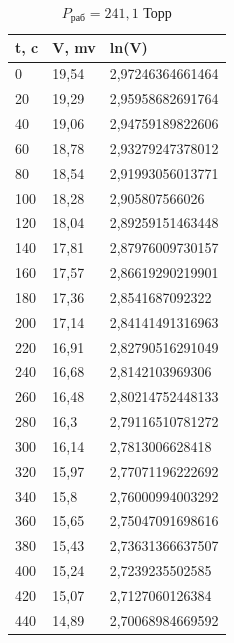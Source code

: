 \documentclass[12pt]{article}
\begin{document}
\begin{table}[H]
	\centering
	\begin{tabular}{|l|l|l|}
		\hline
		t, c & V, mv & ln(V)            \\ \hline
		0    & 19,54 & 2,97246364661464 \\ \hline
		20   & 19,29 & 2,95958682691764 \\ \hline
		40   & 19,06 & 2,94759189822606 \\ \hline
		60   & 18,78 & 2,93279247378012 \\ \hline
		80   & 18,54 & 2,91993056013771 \\ \hline
		100  & 18,28 & 2,905807566026   \\ \hline
		120  & 18,04 & 2,89259151463448 \\ \hline
		140  & 17,81 & 2,87976009730157 \\ \hline
		160  & 17,57 & 2,86619290219901 \\ \hline
		180  & 17,36 & 2,8541687092322  \\ \hline
		200  & 17,14 & 2,84141491316963 \\ \hline
		220  & 16,91 & 2,82790516291049 \\ \hline
		240  & 16,68 & 2,8142103969306  \\ \hline
		260  & 16,48 & 2,80214752448133 \\ \hline
		280  & 16,3  & 2,79116510781272 \\ \hline
		300  & 16,14 & 2,7813006628418  \\ \hline
		320  & 15,97 & 2,77071196222692 \\ \hline
		340  & 15,8  & 2,76000994003292 \\ \hline
		360  & 15,65 & 2,75047091698616 \\ \hline
		380  & 15,43 & 2,73631366637507 \\ \hline
		400  & 15,24 & 2,7239235502585  \\ \hline
		420  & 15,07 & 2,7127060126384  \\ \hline
		440  & 14,89 & 2,70068984669592 \\ \hline
	\end{tabular}
	\caption{$P_\text{раб} = 241,1$ Торр}
\end{table}
\end{document}
